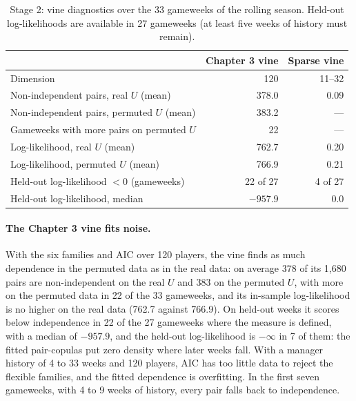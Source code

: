 \documentclass[12pt,oneside,a4paper]{book}
\theoremstyle{definition}
\theoremstyle{remark}
\begin{document}
	\begin{table}[ht]
		\centering
		\caption{Stage 2: vine diagnostics over the 33 gameweeks of the rolling season. Held-out
			log-likelihoods are available in 27 gameweeks (at least five weeks of history must remain).}
		\label{tab:s2-vine}
		\begin{tabular}{lrr}
			\toprule
			& Chapter 3 vine & Sparse vine \\
			\midrule
			Dimension                                   & 120 & 11--32 \\
			Non-independent pairs, real $U$ (mean)      & 378.0 & 0.09 \\
			Non-independent pairs, permuted $U$ (mean)  & 383.2 & --- \\
			Gameweeks with more pairs on permuted $U$   & 22 & --- \\
			Log-likelihood, real $U$ (mean)             & 762.7 & 0.20 \\
			Log-likelihood, permuted $U$ (mean)         & 766.9 & 0.21 \\
			Held-out log-likelihood $<0$ (gameweeks)    & 22 of 27 & 4 of 27 \\
			Held-out log-likelihood, median             & $-957.9$ & 0.0 \\
			\bottomrule
		\end{tabular}
	\end{table}

	\paragraph{The Chapter 3 vine fits noise.} With the six families and AIC over 120 players, the
	vine finds as much dependence in the permuted data as in the real data: on average 378 of its
	1{,}680 pairs are non-independent on the real $U$ and 383 on the permuted $U$, with more on the
	permuted data in 22 of the 33 gameweeks, and its in-sample log-likelihood is no higher on the
	real data (762.7 against 766.9). On held-out weeks it scores below independence in 22 of the 27
	gameweeks where the measure is defined, with a median of $-957.9$, and the held-out
	log-likelihood is $-\infty$ in 7 of them: the fitted pair-copulas put zero density where later
	weeks fall. With a manager history of 4 to 33 weeks and 120 players, AIC has too little data to
	reject the flexible families, and the fitted dependence is overfitting. In the first seven
	gameweeks, with 4 to 9 weeks of history, every pair falls back to independence.
\end{document}
